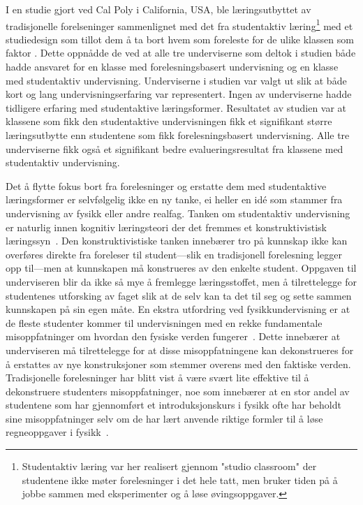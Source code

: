 \documentclass[a4paper,norsk,12pt]{article}
\begin{document}
I en studie gjort ved Cal Poly i California, USA, ble læringsutbyttet av tradisjonelle forelseninger sammenlignet med det fra studentaktiv læring\footnote{Studentaktiv læring var her realisert gjennom "studio classroom" der studentene ikke møter forelesninger i det hele tatt, men bruker tiden på å jobbe sammen med eksperimenter og å løse øvingsoppgaver.} med et studiedesign som tillot dem å ta bort hvem som foreleste for de ulike klassen som faktor \cite{FiveEasyLessons}. Dette oppnådde de ved at alle tre underviserne som deltok i studien både hadde ansvaret for en klasse med forelesningsbasert undervisning og en klasse med studentaktiv undervisning. Underviserne i studien var valgt ut slik at både kort og lang undervisningserfaring var representert. Ingen av underviserne hadde tidligere erfaring med studentaktive læringsformer. Resultatet av studien var at klassene som fikk den studentaktive undervisningen fikk et signifikant større læringsutbytte enn studentene som fikk forelesningsbasert undervisning. Alle tre underviserne fikk også et signifikant bedre evalueringsresultat fra klassene med studentaktiv undervisning.

Det å flytte fokus bort fra forelesninger og erstatte dem med studentaktive læringsformer er selvfølgelig ikke en ny tanke, ei heller en id\'e som stammer fra undervisning av fysikk eller andre realfag. Tanken om studentaktiv undervisning er naturlig innen kognitiv læringsteori der det fremmes et konstruktivistisk læringssyn~\cite{stromso}. Den konstruktivistiske tanken innebærer tro på kunnskap ikke kan overføres direkte fra foreleser til student---slik en tradisjonell forelesning legger opp til---men at kunnskapen må konstrueres av den enkelte student. Oppgaven til underviseren blir da ikke så mye å fremlegge læringsstoffet, men å tilrettelegge for studentenes utforsking av faget slik at de selv kan ta det til seg og sette sammen kunnskapen på sin egen måte. En ekstra utfordring ved fysikkundervisning er at de fleste studenter kommer til undervisningen med en rekke fundamentale misoppfatninger om hvordan den fysiske verden fungerer~\cite{1991AmJPh..59..891V, FiveEasyLessons}. Dette innebærer at underviseren må tilrettelegge for at disse misoppfatningene kan dekonstrueres for å erstattes av nye konstruksjoner som stemmer overens med den faktiske verden. Tradisjonelle forelesninger har blitt vist å være svært lite effektive til å dekonstruere studenters misoppfatninger, noe som innebærer at en stor andel av studentene som har gjennomført et introduksjonskurs i fysikk ofte har beholdt sine misoppfatninger selv om de har lært anvende riktige formler til å løse regneoppgaver i fysikk~\cite{1991AmJPh..59..891V}. 
\end{document}
